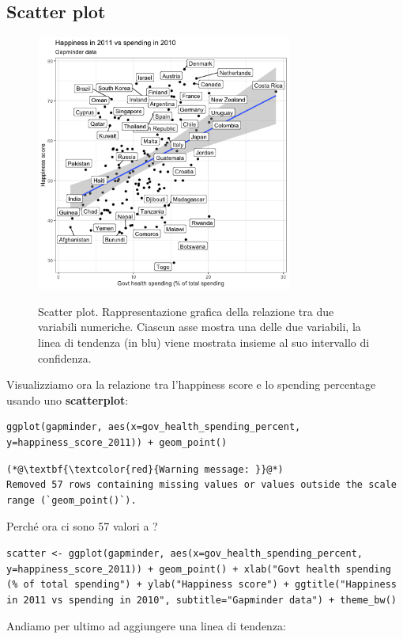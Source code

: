 \subsection{Scatter plot}

\begin{figure}[h]
 \centering
  \includegraphics[width=0.75\textwidth]{images/scatter.png}
  \label{fig:scatter}
 \caption{Scatter plot. Rappresentazione grafica della relazione tra due variabili numeriche. Ciascun asse mostra una delle due variabili, la linea di tendenza (in blu) viene mostrata insieme al suo intervallo di confidenza.}
\end{figure}

Visualizziamo ora la relazione tra l'happiness score e lo spending percentage usando uno \textbf{scatterplot}:

\begin{lstlisting}[style=Rstylescript]
ggplot(gapminder, aes(x=gov_health_spending_percent, y=happiness_score_2011)) + geom_point() 
\end{lstlisting}

\begin{lstlisting}[style=Rstyle]
(*@\textbf{\textcolor{red}{Warning message: }}@*)
Removed 57 rows containing missing values or values outside the scale range (`geom_point()`).
\end{lstlisting}
%
Perch\'e ora ci sono 57 valori a ?

\begin{lstlisting}[style=Rstylescript]
scatter <- ggplot(gapminder, aes(x=gov_health_spending_percent, y=happiness_score_2011)) + geom_point() + xlab("Govt health spending (% of total spending") + ylab("Happiness score") + ggtitle("Happiness in 2011 vs spending in 2010", subtitle="Gapminder data") + theme_bw()
\end{lstlisting}
%
Andiamo per ultimo ad aggiungere una linea di tendenza:


